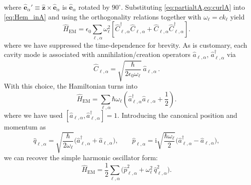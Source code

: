 where $\hat{\bm e}_\alpha' \equiv \hat{\bm z}\times \hat{\bm e}_\alpha$ is $\hat{\bm e}_\alpha$ rotated by $90^\circ$. Substituting \cref{eq:partialtA,eq:curlA} into \cref{eq:Hem_inA} and using the orthogonality relations together with $\omega_\ell = c k_\ell$ yield
\begin{equation}
\hat{H}_\mathrm{EM}
= \epsilon_0 \sum_{\ell,\alpha}\omega_\ell^2
\left[ \hat{C}_{\ell,\alpha}^\dagger \hat{C}_{\ell,\alpha}+\hat{C}_{\ell,\alpha} \hat{C}_{\ell,\alpha}^\dagger\right].
\end{equation}
where we have suppressed the time-dependence for brevity. As is customary,  each cavity mode is associated with annihilation/creation operators $\hat{a}_{\ell,\alpha}$, $\hat{a}_{\ell,\alpha}^\dagger$ via
\begin{equation}
\hat{C}_{\ell,\alpha}=\sqrt{\frac{\hbar}{2\epsilon_0\omega_\ell}}\ \hat{a}_{\ell,\alpha} \,.
\end{equation}
With this choice, the Hamiltonian turns into
\begin{equation}
\hat{H}_\mathrm{EM}
= \sum_{\ell,\alpha}\hbar\omega_\ell\left(\hat{a}_{\ell,\alpha}^\dagger \hat{a}_{\ell,\alpha}+\frac{1}{2}\right).
\end{equation}
where we have used $[\hat{a}_{\ell,\alpha},\hat{a}_{\ell,\alpha}^\dagger] = 1$.
Introducing the canonical position and momentum as
\begin{equation}
\hat{q}_{\ell,\alpha}=\sqrt{\frac{\hbar}{2\omega_\ell}}\bigl(\hat{a}_{\ell,\alpha}^\dagger+\hat{a}_{\ell,\alpha}\bigr),
\qquad
\hat{p}_{\ell,\alpha}=\mathrm{i}\sqrt{\frac{\hbar\omega_\ell}{2}}\bigl(\hat{a}_{\ell,\alpha}^\dagger-\hat{a}_{\ell,\alpha}\bigr),
\end{equation}
we can recover the simple harmonic oscillator form:
\begin{equation}
\hat{H}_\mathrm{EM}
= \frac{1}{2}\sum_{\ell,\alpha}\Big(\hat{p}_{\ell,\alpha}^2+\omega_\ell^2\,\hat{q}_{\ell,\alpha}^2\Big).
\label{eq:HF-sho}
\end{equation}


